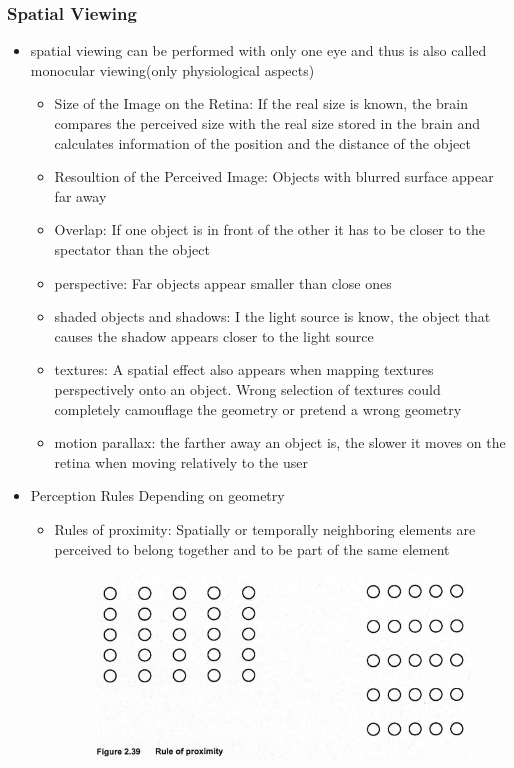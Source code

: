 \documentclass{standalone}
\begin{document}
\subsubsection*{Spatial Viewing}
\begin{itemize}
\item spatial viewing can be performed with only one eye and thus is also called monocular viewing(only physiological aspects)
	\begin{itemize}
		\item Size of the Image on the Retina: If the real size is known, the brain compares the perceived size with the real size stored in the brain and calculates information of the position and the distance of the object
		\item Resoultion of the Perceived Image: Objects with blurred surface appear far away
		\item Overlap: If one object is in front of the other it has to be closer to the spectator than the object
		\item perspective: Far objects appear smaller than close ones
		\item shaded objects and shadows: I the light source is know, the object that causes the shadow appears closer to the light source
		\item textures: A spatial effect also appears when mapping textures perspectively onto an object. Wrong selection of textures could completely camouflage the geometry or pretend a wrong geometry
		\item motion parallax: the farther away an object is, the slower it moves on the retina when moving relatively to the user
	\end{itemize}
	\item Perception Rules Depending on geometry
	\begin{itemize}
		\item Rules of proximity: Spatially or temporally neighboring elements are perceived to belong together and to be part of the same element
		\begin{figure}[H]
			\centering
			\includegraphics[width = 0.5\linewidth]{Figures/2_39.png}
		\end{figure}

\end{itemize}
\end{itemize}
\end{document}
